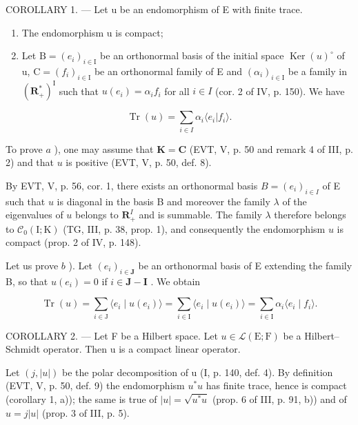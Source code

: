 COROLLARY 1. --- Let u be an endomorphism of E with finite trace.

\begin{enumerate}
\def\labelenumi{\alph{enumi})}
\item
  The endomorphism u is compact;
\item
  Let \(\mathrm{B} = (e_i)_{i \in \mathrm{I}}\) be an orthonormal basis of the initial space \(\operatorname{Ker}(u)^{\circ}\) of u, \(\mathrm{C} = (f_i)_{i \in \mathrm{I}}\) be an orthonormal family of E and \((\alpha_i)_{i \in \mathrm{I}}\) be a family in \((\mathbf{R}_+^*)^{\mathrm{I}}\) such that \(u(e_i) = \alpha_i f_i\) for all \(i \in I\) (cor. 2 of IV, p. 150). We have
\end{enumerate}

\[
\operatorname{Tr} (u) = \sum_ {i \in I} \alpha_ {i} \langle e _ {i} | f _ {i} \rangle .
\]

To prove \(a\) ), one may assume that \(\mathbf{K} = \mathbf{C}\) (EVT, V, p. 50 and remark 4 of III, p. 2) and that \(u\) is positive (EVT, V, p. 50, def. 8).

By EVT, V, p. 56, cor. 1, there exists an orthonormal basis \(B = (e_i)_{i \in I}\) of E such that \(u\) is diagonal in the basis B and moreover the family \(\lambda\) of the eigenvalues of \(u\) belongs to \(\mathbf{R}_+^I\) and is summable. The family \(\lambda\) therefore belongs to \(\mathcal{C}_0(\mathrm{I};\mathrm{K})\) (TG, III, p. 38, prop. 1), and consequently the endomorphism \(u\) is compact (prop. 2 of IV, p. 148).

Let us prove \(b\) ). Let \((e_i)_{i \in \mathbf{J}}\) be an orthonormal basis of E extending the family B, so that \(u(e_i) = 0\) if \(i \in \mathbf{J} - \mathbf{I}\) . We obtain

\[
\operatorname{Tr} (u) = \sum_ {i \in \mathrm{J}} \langle e _ {i} \mid u (e _ {i}) \rangle = \sum_ {i \in \mathrm{I}} \langle e _ {i} \mid u (e _ {i}) \rangle = \sum_ {i \in \mathrm{I}} \alpha_ {i} \langle e _ {i} \mid f _ {i} \rangle .
\]

COROLLARY 2. --- Let F be a Hilbert space. Let \(u \in \mathcal{L}(\mathrm{E};\mathrm{F})\) be a Hilbert--Schmidt operator. Then u is a compact linear operator.

Let \((j,|u|)\) be the polar decomposition of u (I, p. 140, def. 4). By definition (EVT, V, p. 50, def. 9) the endomorphism \(u^{*}u\) has finite trace, hence is compact (corollary 1, a)); the same is true of \(|u|=\sqrt{u^{*}u}\) (prop. 6 of III, p. 91, b)) and of \(u=j|u|\) (prop. 3 of III, p. 5).

